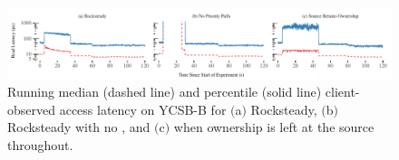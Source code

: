 \begin{figure}[t]
\centering
\includegraphics[width=1.0\textwidth]{graphs/rocksteady-latency.pdf}
  \caption{Running median (dashed line) and \nnnth percentile (solid line)
  client-observed access latency on YCSB-B for $($a$)$ Rocksteady,
  $($b$)$ Rocksteady with no \priopulls, and $($c$)$ when ownership is
  left at the source throughout.}
\label{fig:running-latency}
\end{figure}
